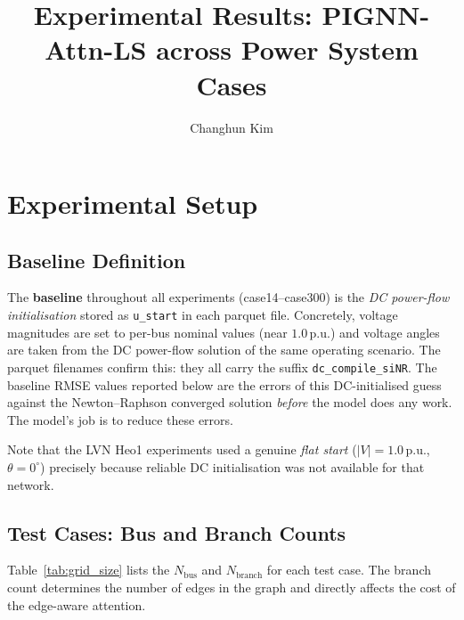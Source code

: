 \documentclass{article}
\title{Experimental Results: PIGNN-Attn-LS across Power System Cases}
\author{Changhun Kim}
\begin{document}
\maketitle

\section{Experimental Setup}

\subsection{Baseline Definition}

The \textbf{baseline} throughout all experiments (case14--case300) is the
\emph{DC power-flow initialisation} stored as \texttt{u\_start} in each
parquet file.  Concretely, voltage magnitudes are set to per-bus nominal
values (near $1.0$\,p.u.) and voltage angles are taken from the DC
power-flow solution of the same operating scenario.  The parquet filenames
confirm this: they all carry the suffix \texttt{dc\_compile\_siNR}.
The baseline RMSE values reported below are the errors of this DC-initialised
guess against the Newton--Raphson converged solution \emph{before} the model
does any work.  The model's job is to reduce these errors.

Note that the LVN Heo1 experiments used a genuine \emph{flat start}
($|V|=1.0$\,p.u., $\theta=0^\circ$) precisely because reliable DC
initialisation was not available for that network.

\subsection{Test Cases: Bus and Branch Counts}

Table~\ref{tab:grid_size} lists the $N_{\mathrm{bus}}$ and $N_{\mathrm{branch}}$
for each test case.  The branch count determines the number of edges in the
graph and directly affects the cost of the edge-aware attention.
\end{document}
